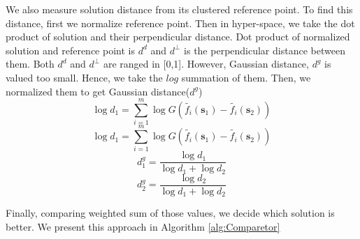 \documentclass[letterpaper, 10 pt, conference]{ieeeconf}  %
\begin{document}
We also measure solution distance from its clustered reference point. To find this distance, first we normalize reference point. Then in hyper-space, we take the dot product of solution and their perpendicular distance. 
Dot product of normalized solution and reference point is $d^d$ and $d^{\perp}$ is the perpendicular distance between them. Both $d^d$ and $d^{\perp}$ are ranged  in [0,1]. However, Gaussian distance, $d^g$ is valued too small. Hence, we take the  $log$ summation of them. Then, we normalized them to get Gaussian distance($d^g$)
\begin{displaymath}
\log d_1=\sum_{i=1}^{m} \log G( \tilde{f_i}(\mathbf{s}_1)-\tilde{f_i}(\mathbf{s}_2))
\end{displaymath}
\begin{displaymath}
\log d_1=\sum_{i=1}^{m} \log G( \tilde{f_i}(\mathbf{s}_1)-\tilde{f_i}(\mathbf{s}_2))
\end{displaymath}
\begin{equation}
d_{1}^g=\frac{\log d_1}{\log d_1 + \log d_2} 
\end{equation}
\begin{equation}
d_{2}^g=\frac{\log d_2}{\log d_1 + \log d_2} 
\end{equation}


Finally, comparing weighted sum of those values, we decide which solution is better. We present this approach in Algorithm \ref{alg:Comparetor}
\end{document}
